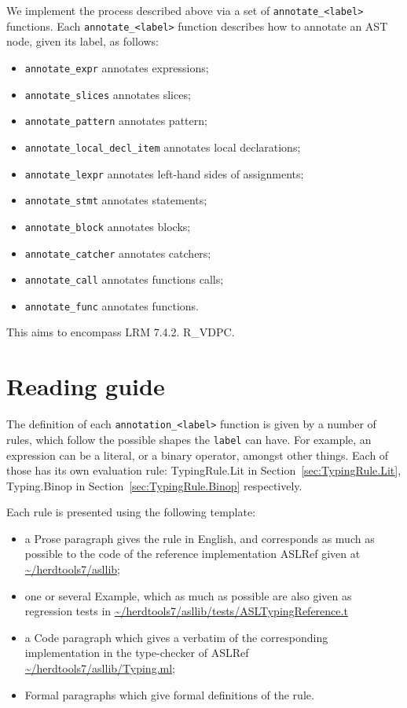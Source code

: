 \documentclass{book}
\begin{document}
We implement the process described above via a set of
\texttt{annotate\_<label>} functions. Each \texttt{annotate\_<label>}
function describes how to annotate an AST node, given its label, as follows:\begin{itemize}
\item \texttt{annotate\_expr} annotates expressions;
\item \texttt{annotate\_slices} annotates slices;
\item \texttt{annotate\_pattern} annotates pattern;
\item \texttt{annotate\_local\_decl\_item} annotates local declarations;
\item \texttt{annotate\_lexpr} annotates left-hand sides of assignments;
\item \texttt{annotate\_stmt} annotates statements;
\item \texttt{annotate\_block} annotates blocks;
\item \texttt{annotate\_catcher} annotates catchers;
\item \texttt{annotate\_call} annotates functions calls;
\item \texttt{annotate\_func} annotates functions.
\end{itemize}

This aims to encompass LRM 7.4.2. R\_VDPC.

\chapter{Reading guide}

The definition of each \texttt{annotation\_<label>} function is given by a number of
rules, which follow the possible shapes the \texttt{label} can have. For 
example, an expression can be a literal, or a binary operator, amongst other
things. Each of those has its own evaluation rule: TypingRule.Lit in
Section~\ref{sec:TypingRule.Lit}, Typing.Binop in
Section~\ref{sec:TypingRule.Binop} respectively.

Each rule is presented using the following template:
\begin{itemize}
\item a Prose paragraph gives the rule in English, and corresponds as much as possible to the code of the reference implementation ASLRef given at \url{~/herdtools7/asllib};
\item one or several Example, which as much as possible are also given as regression tests in \url{~/herdtools7/asllib/tests/ASLTypingReference.t}
\item a Code paragraph which gives a verbatim of the corresponding implementation in the type-checker of ASLRef \url{~/herdtools7/asllib/Typing.ml};
\item Formal paragraphs which give formal definitions of the rule.
\end{itemize}
\end{document}
